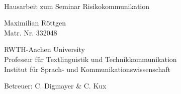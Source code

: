 \documentclass[fontsize=13pt,a4paper]{article}
\begin{document}
\thispagestyle{empty}

{%
\sffamily
\centering
\Large

~\vspace{\fill}

{\huge
Hausarbeit zum Seminar Risikokommunikation}

\vspace{2.5cm}

{\large
Maximilian Röttgen
}\\
Matr. Nr. 332048

\vspace{3.5cm}

RWTH-Aachen University\\
Professur für Textlinguistik und Technikkommunikation\\
Institut für Sprach- und Kommunikationswissenschaft

\vspace{3.5cm}

Betreuer: C. Digmayer & C. Kux

\vspace{\fill}


}%
\clearpage
\sffamily

\tableofcontents
\end{document}
